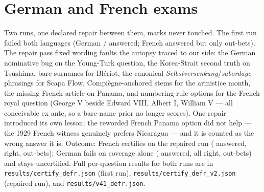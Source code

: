 \documentclass[11pt]{article}
\begin{document}
\begin{table}[h]\centering\small

\caption{Forced choice between the true outcome and a matched false one: share of pairs each reader gets
right, pooled over the three languages, by event. Fifty per cent is a coin.}
\label{tab:duels}
\end{table}

\section{German and French exams}\label{app:defr}
Two runs, one declared repair between them, marks never touched. The first run failed both languages
(German \NDEfirstAnswered{}/\NexamTotal{} answered; French \NFRfirstAnswered{} answered but only
\NFRfirstOutbet{} out-bets). The repair pass fixed wording faults the autopsy traced to our side: the
German nominative bug on the Young-Turk question, the Korea-Strait second truth on Tsushima, bare
surnames for Bl\'eriot, the canonical \emph{Selbstversenkung}/\emph{sabordage} phrasings for Scapa Flow,
Compi\`egne-anchored stems for the armistice month, the missing French article on Panama, and
numbering-rule options for the French royal question (George V beside Edward VIII, Albert I, William V ---
all conceivable ex ante, so a bare-name prior no longer scores). One repair introduced its own lesson: the
reworded French Panama option did not help --- the 1929 French witness genuinely prefers Nicaragua --- and
it is counted as the wrong answer it is. Outcome: French certifies on the repaired run
(\NFRexamAnswered{} answered, \NFRexamCorrect{} right, \NFRexamOutbet{} out-bets); German fails on
coverage alone (\NDEexamAnswered{} answered, all right, \NDEexamOutbet{} out-bets) and stays uncertified.
Full per-question results for both runs are in \texttt{results/certify\_defr.json} (first run),
\texttt{results/certify\_defr\_v2.json} (repaired run), and \texttt{results/v41\_defr.json}.
\end{document}
